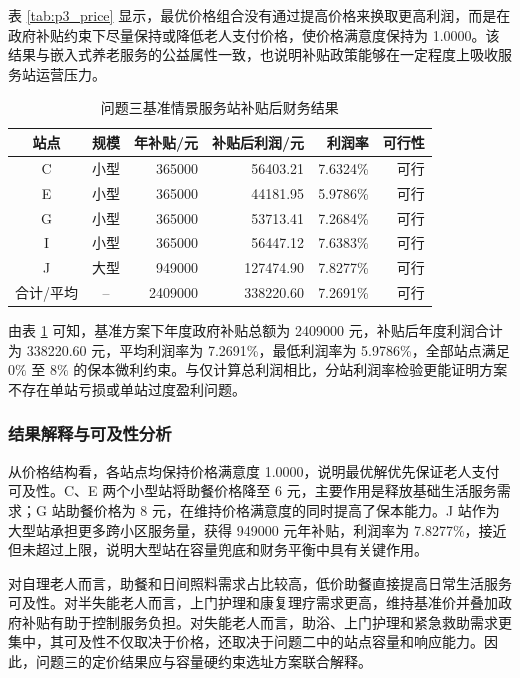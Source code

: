 表 \ref{tab:p3_price} 显示，最优价格组合没有通过提高价格来换取更高利润，而是在政府补贴约束下尽量保持或降低老人支付价格，使价格满意度保持为 1.0000。该结果与嵌入式养老服务的公益属性一致，也说明补贴政策能够在一定程度上吸收服务站运营压力。

\begin{table}[H]
\centering
\caption{问题三基准情景服务站补贴后财务结果}
\label{tab:p3_finance}
\begin{tabular}{c c r r r r}
\toprule
站点 & 规模 & 年补贴/元 & 补贴后利润/元 & 利润率 & 可行性 \\
\midrule
C & 小型 & 365000 & 56403.21 & 7.6324\% & 可行 \\
E & 小型 & 365000 & 44181.95 & 5.9786\% & 可行 \\
G & 小型 & 365000 & 53713.41 & 7.2684\% & 可行 \\
I & 小型 & 365000 & 56447.12 & 7.6383\% & 可行 \\
J & 大型 & 949000 & 127474.90 & 7.8277\% & 可行 \\
\midrule
合计/平均 & -- & 2409000 & 338220.60 & 7.2691\% & 可行 \\
\bottomrule
\end{tabular}
\end{table}

由表 \ref{tab:p3_finance} 可知，基准方案下年度政府补贴总额为 2409000 元，补贴后年度利润合计为 338220.60 元，平均利润率为 7.2691\%，最低利润率为 5.9786\%，全部站点满足 $0\%$ 至 $8\%$ 的保本微利约束。与仅计算总利润相比，分站利润率检验更能证明方案不存在单站亏损或单站过度盈利问题。

\subsubsection{结果解释与可及性分析}

从价格结构看，各站点均保持价格满意度 1.0000，说明最优解优先保证老人支付可及性。C、E 两个小型站将助餐价格降至 6 元，主要作用是释放基础生活服务需求；G 站助餐价格为 8 元，在维持价格满意度的同时提高了保本能力。J 站作为大型站承担更多跨小区服务量，获得 949000 元年补贴，利润率为 7.8277\%，接近但未超过上限，说明大型站在容量兜底和财务平衡中具有关键作用。

对自理老人而言，助餐和日间照料需求占比较高，低价助餐直接提高日常生活服务可及性。对半失能老人而言，上门护理和康复理疗需求更高，维持基准价并叠加政府补贴有助于控制服务负担。对失能老人而言，助浴、上门护理和紧急救助需求更集中，其可及性不仅取决于价格，还取决于问题二中的站点容量和响应能力。因此，问题三的定价结果应与容量硬约束选址方案联合解释。